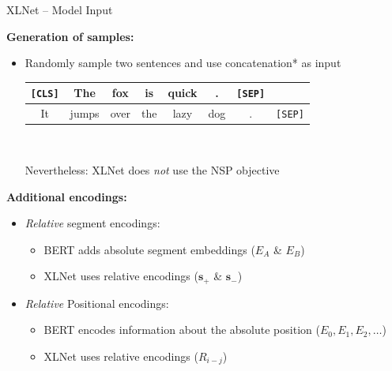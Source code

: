\documentclass[]{beamer}
\renewcommand{\vec}[1]{\mathbf{#1}}
\begin{document}
\begin{frame}{XLNet -- Model Input}

\textbf{Generation of samples:}

\begin{itemize}
\item Randomly sample two sentences and use concatenation* as input
			{\footnotesize
\begin{center}
\begin{tabular}{|cccccccc|}
\hline
\cellcolor{blue!15}\texttt{[CLS]} & The & fox & is & quick & . & \cellcolor{blue!15}\texttt{[SEP]} &\\\hline\hline It & jumps & over & the & lazy & dog & . & \cellcolor{blue!15}\texttt{[SEP]} \\
\hline
\end{tabular}\\\mbox{}
\end{center}}
{\scriptsize *Nevertheless: XLNet does \textit{not} use the NSP objective }
\end{itemize}

\textbf{Additional encodings:}

\begin{itemize}
\item \textit{Relative} segment encodings:
	\begin{itemize}
		\item BERT adds absolute segment embeddings ($E_A$ \& $E_B$)
		\item XLNet uses relative encodings ($\vec{s}_+$ \& $\vec{s}_-$)
	\end{itemize}
\item \textit{Relative} Positional encodings:
	\begin{itemize}
		\item BERT encodes information about the absolute position ($E_0, E_1, E_2, \hdots$)
		\item XLNet uses relative encodings ($R_{i - j}$)
	\end{itemize}
\end{itemize}
\end{frame}
\end{document}

